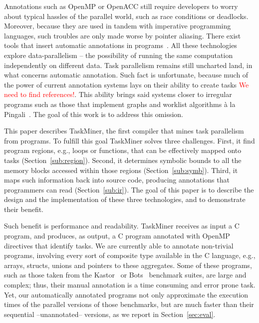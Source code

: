 \documentclass[sigplan,10pt,review,anonymous]{acmart}
\newcommand{\ed}[1]{\noindent\textcolor{red}{ {#1}}}
\newcommand{\ed}[1]{}
\newcommand\Taskminer{\mbox{\textsf{TaskMiner}}}
\begin{document}
Annotations such as OpenMP or OpenACC still require developers to
worry about typical hassles of the parallel world, such as race conditions
or deadlocks.
Moreover, because they are used in tandem with imperative programming languages,
such troubles are only made worse by pointer aliasing.
There exist tools that insert automatic annotations in
programs~\cite{gleison2016,Pingali11,wanggenerating}.
All these technologies explore data-parallelism -- the possibility of running
the same computation independently on different data.
Task parallelism remains still uncharted land, in what concerns automatic
annotation.
Such fact is unfortunate, because much of the power of current annotation
systems lays on their ability to create tasks \ed{We need to find references!}.
This ability brings said systems closer to irregular programs such as those
that implement graphs and worklist algorithms \`{a} la
Pingali~\cite{Ben-Nun17,Kulkarni11,Pingali11}.
The goal of this work is to address this omission.

This paper describes \Taskminer, the first compiler that mines task parallelism
from programs.
To fulfill this goal \Taskminer{} solves three challenges.
First, it find program regions, e.g., loops or functions, that can be
effectively mapped onto tasks (Section~\ref{sub:region}).
Second, it determines symbolic bounds to all the memory blocks accessed within
those regions (Section~\ref{sub:symb}).
Third, it maps such information back into source code, producing annotations
that programmers can read (Section~\ref{sub:ir}).
The goal of this paper is to describe the design and the implementation of these
three technologies, and to demonstrate their benefit.

Such benefit is performance and readability.
\Taskminer{} receives as input a C program, and produces, as output, a C
program annotated with OpenMP directives that identify tasks.
We are currently able to annotate non-trivial programs, involving every
sort of composite type available in the C language, e.g., arrays, structs,
unions and pointers to these aggregates.
Some of these programs, such as those taken from the
Kastor~\cite{Virouleau14} or Bots~\cite{Duran09}
benchmark suites, are large and complex; thus, their manual annotation is a
time consuming and error prone task.
Yet, our automatically annotated programs not only approximate the execution
times of the parallel versions of those benchmarks, but are much faster than
their sequential --unannotated-- versions, as we report in Section~\ref{sec:eval}.
\end{document}

